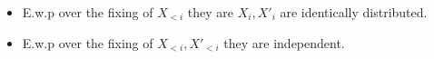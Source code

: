 \documentclass[11pt]{article}
\numberwithin{equation}{section} %
\numberwithin{figure}{section} %
\newtheorem{claim}[thm]{Claim}
\newcommand{\out}{\ensuremath{\mathsf{out}}\xspace}
\begin{document}
 \begin{itemize}
  \item 
 E.w.p \negl over the fixing of $X_{<i}$ they are $X_i,X'_i$ are identically distributed.
 
 \item E.w.p \negl over the fixing of $X_{<i},X'_{<i}$ they are independent.
\end{itemize}
% 
\end{document}
